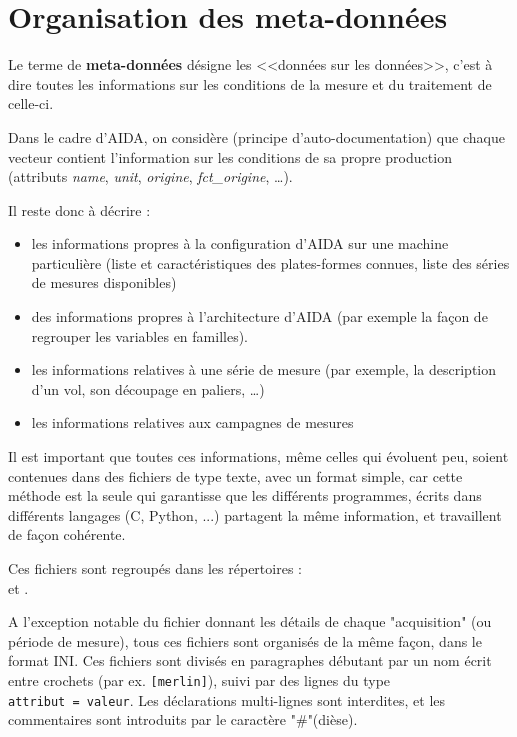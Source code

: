 
\part{Organisation des meta-données}
\label{part:meta}
   Le terme de \textbf{meta-données} désigne les 
<<données sur les données>>, c'est à dire toutes
les informations sur les conditions de la mesure
et du traitement de celle-ci.

   Dans le cadre d'AIDA, on considère (principe d'auto-documentation)
que chaque vecteur contient l'information sur les 
conditions de sa propre production (attributs \textit{name},
\textit{unit}, \textit{origine},
\textit{fct\_origine}, \ldots). 

   Il reste donc à décrire : 
\begin{itemize}
  \item les informations propres à la configuration d'AIDA sur une machine
      particulière (liste et caractéristiques des plates-formes connues,
      liste des séries de mesures disponibles)
  \item des informations propres à l'architecture d'AIDA (par exemple
   la façon de regrouper les variables en familles).
  \item les informations relatives à une série de mesure (par exemple, 
      la description d'un vol, son découpage en paliers, \ldots) 
  \item les informations relatives aux campagnes de mesures
\end{itemize}

Il est important que toutes ces informations, même
celles qui évoluent peu, soient contenues dans des fichiers de
type texte, avec un format simple, car cette méthode est la
seule qui garantisse que les différents programmes, écrits dans
différents langages (C, Python, ...) partagent la même
information, et travaillent de façon cohérente.

Ces fichiers sont regroupés dans les répertoires : \\
\-\hspace{1cm}  et . 

A l'exception notable du fichier donnant les détails
de chaque "acquisition" (ou période de mesure), tous
ces fichiers sont organisés de la même façon,
dans le format INI. Ces fichiers sont divisés en paragraphes débutant par un
nom écrit entre
crochets (par ex. \texttt{[merlin]}), suivi par des
lignes du type \texttt{attribut~=~valeur}. Les 
déclarations multi-lignes sont interdites, et les 
commentaires sont introduits par le caractère "\#"(dièse).

